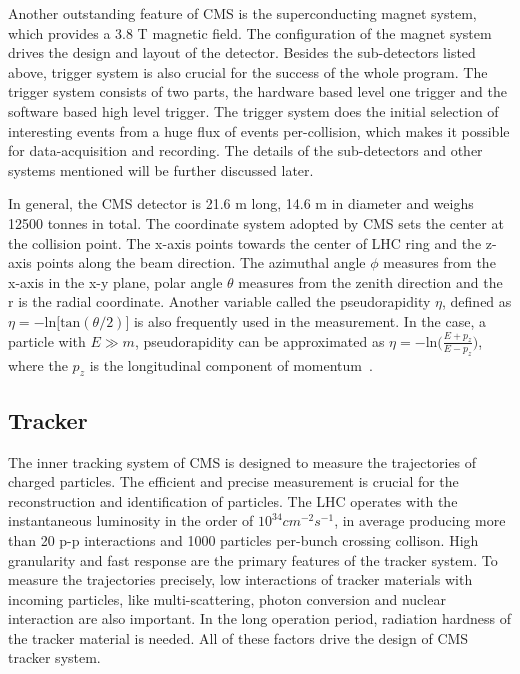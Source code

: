 Another outstanding feature of CMS is the superconducting magnet system, which provides a 3.8 T magnetic field. The configuration of the magnet system drives the design and layout of the detector. Besides the sub-detectors listed above, trigger system is also crucial for the success of the whole program. The trigger system consists of two parts, the hardware based level one trigger and the software based high level trigger. The trigger system does the initial selection of interesting events from a huge flux of events per-collision, which makes it possible for data-acquisition and recording. The details of the sub-detectors and other systems mentioned will be further discussed later. 

In general, the CMS detector is 21.6 m long, 14.6 m in diameter and weighs 12500 tonnes in total. The coordinate system adopted by CMS sets the center at the collision point. The x-axis points towards the center of LHC ring and the z-axis points along the beam direction. The azimuthal angle $\phi$  measures from the x-axis in the x-y plane, polar angle $\theta$ measures from the zenith direction  and the r is the radial coordinate. Another variable called the pseudorapidity $\eta$, defined as $\eta=-\textrm{ln}\big[\textrm{tan}(\theta/2)\big]$ is also frequently used in the measurement. In the case, a particle with $E\gg m$, pseudorapidity can be approximated as $\eta=-\textrm{ln}\big(\frac{E+p_{z}}{E-p_{z}}\big)$, where the $p_{z}$ is the longitudinal component of momentum~\cite{CMS_experiment}. 

\subsection{Tracker}
The inner tracking system of CMS is designed to measure the trajectories of charged particles. The efficient and precise measurement is crucial for the reconstruction and identification of particles. The LHC operates with the instantaneous luminosity in the order of $10^{34}cm^{-2}s^{-1}$, in average producing more than 20 p-p interactions and 1000 particles per-bunch crossing collison. High granularity and fast response are the primary features of the tracker system. To measure the trajectories precisely, low interactions of tracker materials with incoming particles, like multi-scattering, photon conversion and nuclear interaction are also important. In the long operation period, radiation hardness of the tracker material is needed. All of these factors drive the design of CMS tracker system.


